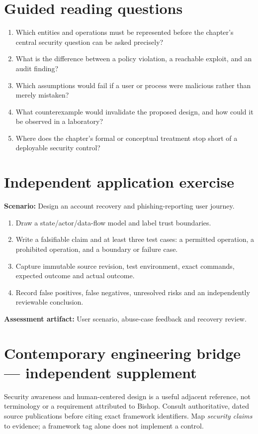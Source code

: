 \documentclass[10pt,letterpaper]{article}
\begin{document}
\section{Guided reading questions}
\begin{enumerate}
\item Which entities and operations must be represented before the chapter's central security question can be asked precisely?
\item What is the difference between a policy violation, a reachable exploit, and an audit finding?
\item Which assumptions would fail if a user or process were malicious rather than merely mistaken?
\item What counterexample would invalidate the proposed design, and how could it be observed in a laboratory?
\item Where does the chapter's formal or conceptual treatment stop short of a deployable security control?
\end{enumerate}
\section{Independent application exercise}
\textbf{Scenario:} Design an account recovery and phishing-reporting user journey.
\begin{enumerate}
\item Draw a state/actor/data-flow model and label trust boundaries.
\item Write a falsifiable claim and at least three test cases: a permitted operation, a prohibited operation, and a boundary or failure case.
\item Capture immutable source revision, test environment, exact commands, expected outcome and actual outcome.
\item Record false positives, false negatives, unresolved risks and an independently reviewable conclusion.
\end{enumerate}
\textbf{Assessment artifact:} User scenario, abuse-case feedback and recovery review.
\section{Contemporary engineering bridge --- independent supplement}
Security awareness and human-centered design is a useful adjacent reference, not terminology or a requirement attributed to Bishop. Consult authoritative, dated source publications before citing exact framework identifiers. Map \emph{security claims} to evidence; a framework tag alone does not implement a control.
\end{document}
